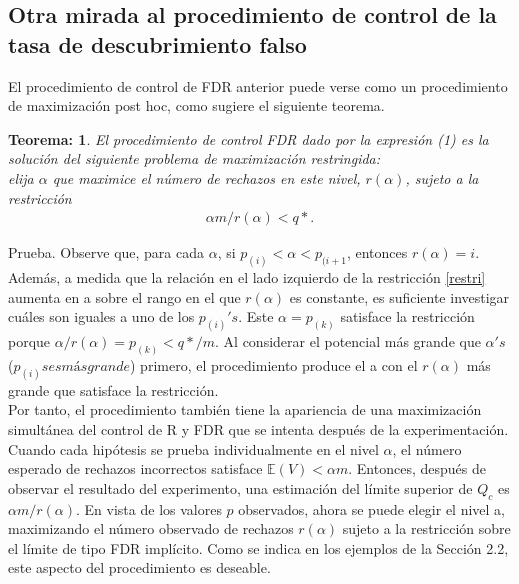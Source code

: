 \documentclass[11pt,letterpaper]{article}
\newcommand{\mE}{\mathbb{E}}
\newtheorem{thmt}{Teorema:}
\begin{document}
\subsection{Otra mirada al procedimiento de control de la tasa de descubrimiento falso}
El procedimiento de control de FDR anterior puede verse como un procedimiento de maximización post hoc, como sugiere el siguiente teorema.\\

\begin{framed}
    \begin{thmt} \label{d_ortogonal}
El procedimiento de control FDR dado por la expresión (1) es la solución del siguiente problema de maximización restringida: \\
elija $\alpha$ que maximice el número de rechazos en este nivel, $r (\alpha)$, sujeto a la restricción 
\begin{align}\label{restri}
\alpha m / r (\alpha) <q*.
\end{align}
    \end{thmt}
\end{framed}
Prueba. Observe que, para cada $\alpha$, si $p_{(i)} <\alpha< p_{(i +1}$, entonces $r (\alpha) = i$. Además, a medida que la relación en el lado izquierdo de la restricción \ref{restri} aumenta en a sobre el rango en el que $r(\alpha)$ es constante, es suficiente investigar cuáles son iguales a uno de los $p_{(i)}'s$. Este $\alpha = p_{(k)}$ satisface la restricción porque $\alpha / r (\alpha) = p_{(k)} <q * / m.$ Al considerar el potencial más grande que $\alpha's$ ($p_{(i)}s es más grande$) primero, el procedimiento produce el a con el $r(\alpha)$ más grande que satisface la restricción.\\
Por tanto, el procedimiento también tiene la apariencia de una maximización simultánea del control de R y FDR que se intenta después de la experimentación. Cuando cada hipótesis se prueba individualmente en el nivel $\alpha$, el número esperado de rechazos incorrectos satisface $\mE(V) <\alpha m$. Entonces, después de observar el resultado del experimento, una estimación del límite superior de $Q_c$ es $\alpha m / r (\alpha)$. En vista de los valores $p$ observados, ahora se puede elegir el nivel a, maximizando el número observado de rechazos $r(\alpha)$ sujeto a la restricción sobre el límite de tipo FDR implícito. Como se indica en los ejemplos de la Sección 2.2, este aspecto del procedimiento es deseable.
\end{document}
